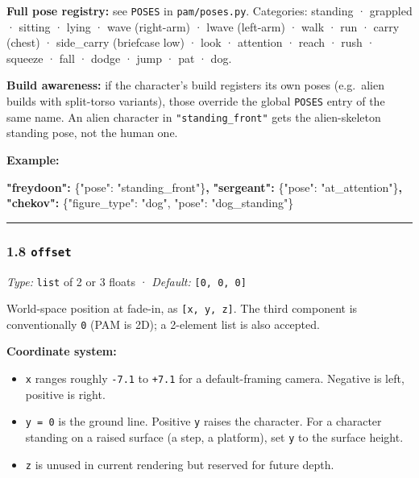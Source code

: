 \documentclass[
  11pt,
]{book}
\newenvironment{Shaded}{}{}
\newcommand{\DataTypeTok}[1]{\textcolor[rgb]{0.56,0.13,0.00}{#1}}
\newcommand{\ErrorTok}[1]{\textcolor[rgb]{1.00,0.00,0.00}{\textbf{#1}}}
\newcommand{\FunctionTok}[1]{\textcolor[rgb]{0.02,0.16,0.49}{#1}}
\newcommand{\StringTok}[1]{\textcolor[rgb]{0.25,0.44,0.63}{#1}}
\providecommand{\tightlist}{%
  \setlength{\itemsep}{0pt}\setlength{\parskip}{0pt}}
\begin{document}
\textbf{Full pose registry:} see \texttt{POSES} in
\texttt{pam/poses.py}. Categories: standing · grappled · sitting · lying
· wave (right-arm) · lwave (left-arm) · walk · run · carry (chest) ·
side\_carry (briefcase low) · look · attention · reach · rush · squeeze
· fall · dodge · jump · pat · dog.

\textbf{Build awareness:} if the character's build registers its own
poses (e.g.~alien builds with split-torso variants), those override the
global \texttt{POSES} entry of the same name. An alien character in
\texttt{"standing\_front"} gets the alien-skeleton standing pose, not
the human one.

\textbf{Example:}

\begin{Shaded}
\begin{Highlighting}[]
\ErrorTok{"freydoon":} \FunctionTok{\{}\DataTypeTok{"pose"}\FunctionTok{:} \StringTok{"standing\_front"}\FunctionTok{\}}\ErrorTok{,}
\ErrorTok{"sergeant":} \FunctionTok{\{}\DataTypeTok{"pose"}\FunctionTok{:} \StringTok{"at\_attention"}\FunctionTok{\}}\ErrorTok{,}
\ErrorTok{"chekov":}   \FunctionTok{\{}\DataTypeTok{"figure\_type"}\FunctionTok{:} \StringTok{"dog"}\FunctionTok{,} \DataTypeTok{"pose"}\FunctionTok{:} \StringTok{"dog\_standing"}\FunctionTok{\}}
\end{Highlighting}
\end{Shaded}

\begin{center}\rule{0.5\linewidth}{0.5pt}\end{center}

\subsubsection{\texorpdfstring{1.8
\texttt{offset}}{1.8 offset}}\label{offset}

\emph{Type:} \texttt{list} of 2 or 3 floats · \emph{Default:}
\texttt{{[}0,\ 0,\ 0{]}}

World-space position at fade-in, as \texttt{{[}x,\ y,\ z{]}}. The third
component is conventionally \texttt{0} (PAM is 2D); a 2-element list is
also accepted.

\textbf{Coordinate system:}

\begin{itemize}
\tightlist
\item
  \texttt{x} ranges roughly \texttt{-7.1} to \texttt{+7.1} for a
  default-framing camera. Negative is left, positive is right.
\item
  \texttt{y\ =\ 0} is the ground line. Positive \texttt{y} raises the
  character. For a character standing on a raised surface (a step, a
  platform), set \texttt{y} to the surface height.
\item
  \texttt{z} is unused in current rendering but reserved for future
  depth.
\end{itemize}
\end{document}
